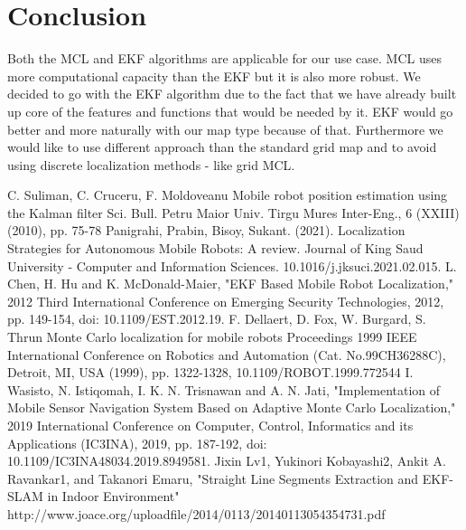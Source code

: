 \documentclass[12pt, a4paper, onecolumn]{article}
\begin{document}
\section{Conclusion}

Both the MCL and EKF algorithms are applicable for our use case.
MCL uses more computational capacity than the EKF but it is also more robust.
We decided to go with the EKF algorithm due to the fact that we have already built up core of the features and functions that would be needed by it. 
EKF would go better and more naturally with our map type because of that. 
Furthermore we would like to use different approach than the standard grid map and to avoid using discrete localization methods - like grid MCL. 
\newpage
\begin{thebibliography}{9}

C. Suliman, C. Cruceru, F. Moldoveanu
Mobile robot position estimation using the Kalman filter
Sci. Bull. Petru Maior Univ. Tirgu Mures Inter-Eng., 6 (XXIII) (2010), pp. 75-78
Panigrahi, Prabin, Bisoy, Sukant. (2021). Localization Strategies for Autonomous Mobile Robots: A review. Journal of King Saud University - Computer and Information Sciences. 10.1016/j.jksuci.2021.02.015. 
L. Chen, H. Hu and K. McDonald-Maier, "EKF Based Mobile Robot Localization," 2012 Third International Conference on Emerging Security Technologies, 2012, pp. 149-154, doi: 10.1109/EST.2012.19.
F. Dellaert, D. Fox, W. Burgard, S. Thrun
Monte Carlo localization for mobile robots
Proceedings 1999 IEEE International Conference on Robotics and Automation (Cat. No.99CH36288C), Detroit, MI, USA (1999), pp. 1322-1328, 10.1109/ROBOT.1999.772544
I. Wasisto, N. Istiqomah, I. K. N. Trisnawan and A. N. Jati, "Implementation of Mobile Sensor Navigation System Based on Adaptive Monte Carlo Localization," 2019 International Conference on Computer, Control, Informatics and its Applications (IC3INA), 2019, pp. 187-192, doi: 10.1109/IC3INA48034.2019.8949581.
Jixin Lv1, Yukinori Kobayashi2, Ankit A. Ravankar1, and Takanori Emaru, "Straight Line Segments Extraction and EKF-SLAM in Indoor Environment" http://www.joace.org/uploadfile/2014/0113/20140113054354731.pdf
\end{thebibliography}
\end{document}
